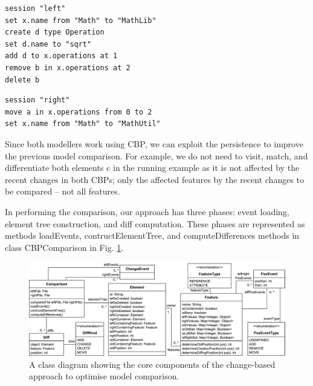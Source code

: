 \documentclass{llncs}
\begin{document}
\begin{minipage}[t]{0.49\linewidth}    
\begin{lstlisting}[firstnumber=13,style=eol,caption={The CBP of the model in Fig. \ref{fig:left} (left version).},label=lst:leftcbp]
session "left"
set x.name from "Math" to "MathLib"
create d type Operation
set d.name to "sqrt"
add d to x.operations at 1
remove b in x.operations at 2
delete b
\end{lstlisting}
\end{minipage}
\hfill
\begin{minipage}[t]{0.49\linewidth}
\begin{lstlisting}[firstnumber=13,style=eol,caption={The CBP of the model in Fig. \ref{fig:right} (right version).},label=lst:rightcbp]
session "right"
move a in x.operations from 0 to 2
set x.name from "Math" to "MathUtil"
\end{lstlisting}
\end{minipage}

Since both modellers work using CBP, we can exploit the persistence to improve the previous model comparison. For example, we do not need to visit, match, and differentiate both elements \textsf{c} in the running example as it is not affected by the recent changes in both CBPs; only the affected features by the recent changes to be compared -- not all features. 

In performing the comparison, our approach has three phases: event loading, element tree construction, and diff computation. These phases are represented as methods \textsf{loadEvents}, \textsf{contructElementTree}, and \textsf{computeDifferences} methods in class \textsf{CBPComparison} in Fig. \ref{fig:approach_class_diagram}. 

\vspace{-10pt}
\begin{figure}
    \includegraphics[width=\linewidth]{images/TreeClassDiagram}
    \caption{A class diagram showing the core components of the change-based approach to optimise model comparison.}
    \label{fig:approach_class_diagram}
\end{figure}
\end{document}
